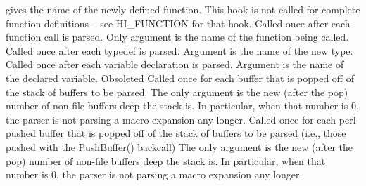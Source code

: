 gives the name of the newly defined function.  This hook is not called
for complete function definitions -- see HI\_\-FUNCTION for that hook.
Called once after each function call is parsed.  Only argument is
the name of the function being called.
Called once after each typedef is parsed.  Argument is the name
of the new type.
Called once after each variable declaration is parsed.  Argument is the name
of the declared variable.
 Obsoleted
Called once for each buffer that is popped off of the stack of
buffers to be parsed. The only argument is the new (after the pop)
number of non-file buffers
deep the stack is.  In particular, when that number is 0, 
the parser is not parsing a macro expansion any longer.
Called once for each perl-pushed buffer that is popped off of the stack of
buffers to be parsed (i.e., those pushed with the PushBuffer() backcall)
The only argument is the new (after the pop)
number of non-file buffers
deep the stack is.  In particular, when that number is 0, 
the parser is not parsing a macro expansion any longer.
